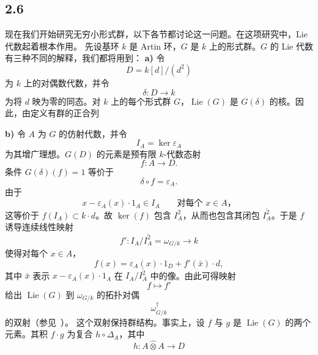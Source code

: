 
\subsection*{2.6}
\label{sga3:VIIB:2.6}
现在我们开始研究无穷小形式群，以下各节都讨论这一问题。在这项研究中，Lie 代数起着根本作用。
先设基环 \(k\) 是 Artin 环，\(G\) 是 \(k\) 上的形式群。\(G\) 的 Lie 代数有三种不同的解释，我们都将用到：
\medskip
\noindent\textbf{a)}
令
\[
  D=k[d]/(d^2)
\]
为 \(k\) 上的对偶数代数，并令
\[
  \delta:D\longrightarrow k
\]
为将 \(d\) 映为零的同态。对 \(k\) 上的每个形式群 \(G\)，\(\operatorname{Lie}(G)\) 是 \(G(\delta)\) 的核。因此，由定义有群的正合列
\begin{center}
  \label{sga3:VIIB:2.6:dual-numbers-exact-sequence}
  
\end{center}
\medskip
\noindent\textbf{b)}
令 \(A\) 为 \(G\) 的仿射代数，并令
\[
  I_A=\ker\varepsilon_A
\]
为其增广理想。\(G(D)\) 的元素是预有限 \(k\)-代数态射
\[
  f:A\longrightarrow D.
\]
条件 \(G(\delta)(f)=1\) 等价于
\[
  \delta\circ f=\varepsilon_A.
\]
由于
\[
  x-\varepsilon_A(x)\cdot1_A\in I_A
  \qquad\text{对每个 \(x\in A\)，}
\]
这等价于 \(f(I_A)\subset k\cdot d\)。故 \(\ker(f)\) 包含 \(I_A^2\)，从而也包含其闭包 \(\overline{I_A^2}\)。于是 \(f\) 诱导连续线性映射
\[
  f':
  I_A/\overline{I_A^2}
  =
  \omega_{G/k}
  \longrightarrow k
\]
使得对每个 \(x\in A\)，
\[
  f(x)
  =
  \varepsilon_A(x)\cdot1_D+f'(\bar x)\cdot d,
\]
其中 \(\bar x\) 表示 \(x-\varepsilon_A(x)\cdot1_A\) 在 \(I_A/\overline{I_A^2}\) 中的像。由此可得映射
\[
  f\longmapsto f'
\]
给出 \(\operatorname{Lie}(G)\) 到 \(\omega_{G/k}\) 的拓扑对偶
\[
  \omega_{G/k}^{\dagger}
\]
的双射\textup{（参见\ ）}。
这个双射保持群结构。事实上，设 \(f\) 与 \(g\) 是 \(\operatorname{Lie}(G)\) 的两个元素。其积 \(f\cdot g\) 为复合 \(h\circ\Delta_A\)，其中
\[
  h:A\widehat\otimes A\longrightarrow D
\]
